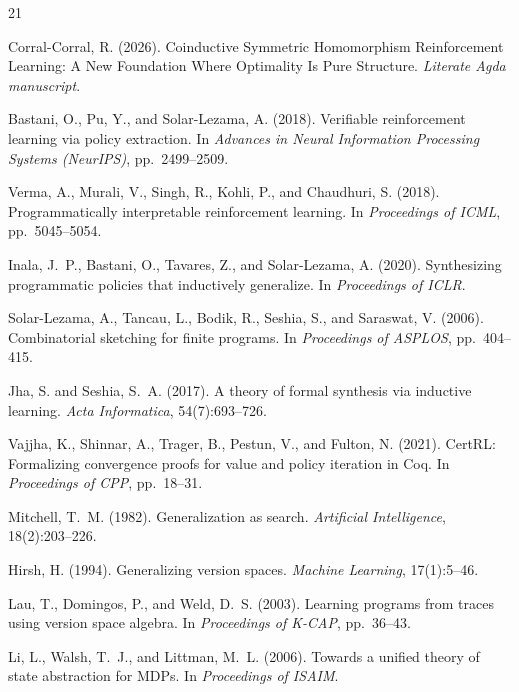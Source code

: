 \documentclass[9pt,a4paper]{article}
\theoremstyle{plain}
\theoremstyle{definition}
\theoremstyle{remark}
\begin{document}
\appendix


\begin{thebibliography}{21}

Corral-Corral, R. (2026).
Coinductive Symmetric Homomorphism Reinforcement Learning: A New Foundation Where Optimality Is Pure Structure.
\textit{Literate Agda manuscript}.

Bastani, O., Pu, Y., and Solar-Lezama, A. (2018).
Verifiable reinforcement learning via policy extraction.
In \textit{Advances in Neural Information Processing Systems (NeurIPS)}, pp.~2499--2509.

Verma, A., Murali, V., Singh, R., Kohli, P., and Chaudhuri, S. (2018).
Programmatically interpretable reinforcement learning.
In \textit{Proceedings of ICML}, pp.~5045--5054.

Inala, J.~P., Bastani, O., Tavares, Z., and Solar-Lezama, A. (2020).
Synthesizing programmatic policies that inductively generalize.
In \textit{Proceedings of ICLR}.

Solar-Lezama, A., Tancau, L., Bodik, R., Seshia, S., and Saraswat, V. (2006).
Combinatorial sketching for finite programs.
In \textit{Proceedings of ASPLOS}, pp.~404--415.

Jha, S. and Seshia, S.~A. (2017).
A theory of formal synthesis via inductive learning.
\textit{Acta Informatica}, 54(7):693--726.

Vajjha, K., Shinnar, A., Trager, B., Pestun, V., and Fulton, N. (2021).
CertRL: Formalizing convergence proofs for value and policy iteration in Coq.
In \textit{Proceedings of CPP}, pp.~18--31.

Mitchell, T.~M. (1982).
Generalization as search.
\textit{Artificial Intelligence}, 18(2):203--226.

Hirsh, H. (1994).
Generalizing version spaces.
\textit{Machine Learning}, 17(1):5--46.

Lau, T., Domingos, P., and Weld, D.~S. (2003).
Learning programs from traces using version space algebra.
In \textit{Proceedings of K-CAP}, pp.~36--43.

Li, L., Walsh, T.~J., and Littman, M.~L. (2006).
Towards a unified theory of state abstraction for MDPs.
In \textit{Proceedings of ISAIM}.


\end{thebibliography}
\end{document}
